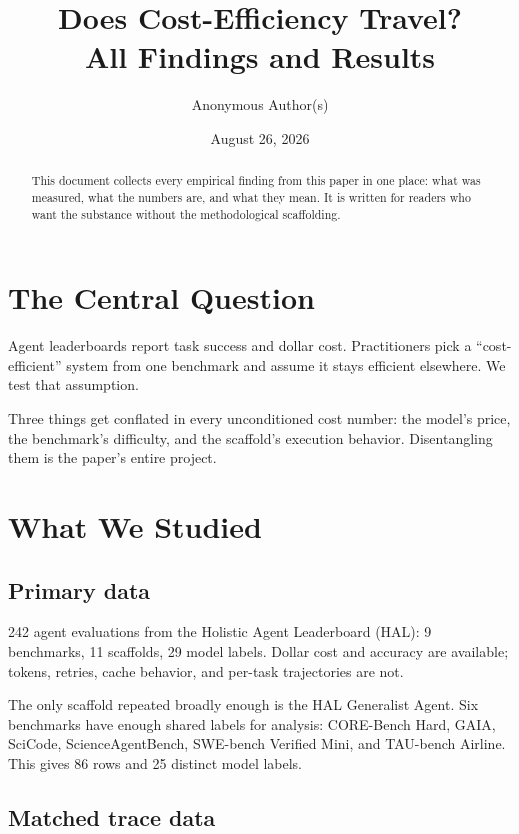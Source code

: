 \documentclass[11pt]{article}
\title{Does Cost-Efficiency Travel?\\[4pt]
\large All Findings and Results}
\author{Anonymous Author(s)}
\date{August 26, 2026}
\begin{document}
\maketitle

\begin{abstract}
This document collects every empirical finding from this paper in one place:
what was measured, what the numbers are, and what they mean. It is written
for readers who want the substance without the methodological scaffolding.
\end{abstract}

\section{The Central Question}

Agent leaderboards report task success and dollar cost. Practitioners pick a
``cost-efficient'' system from one benchmark and assume it stays efficient
elsewhere. We test that assumption.

Three things get conflated in every unconditioned cost number: the model's
price, the benchmark's difficulty, and the scaffold's execution behavior.
Disentangling them is the paper's entire project.

\section{What We Studied}

\subsection{Primary data}

242 agent evaluations from the Holistic Agent Leaderboard (HAL): 9 benchmarks,
11 scaffolds, 29 model labels. Dollar cost and accuracy are available; tokens,
retries, cache behavior, and per-task trajectories are not.

The only scaffold repeated broadly enough is the HAL Generalist Agent. Six
benchmarks have enough shared labels for analysis: CORE-Bench Hard, GAIA,
SciCode, ScienceAgentBench, SWE-bench Verified Mini, and TAU-bench Airline.
This gives 86 rows and 25 distinct model labels.

\subsection{Matched trace data}
\end{document}
